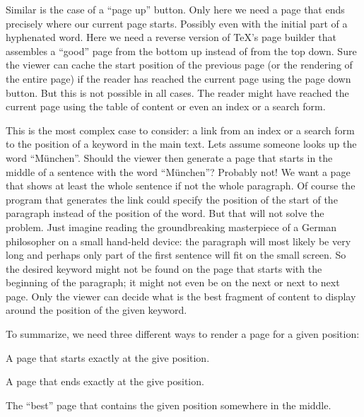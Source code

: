 Similar is the case of a ``page up'' button. Only here we need a page
that ends precisely where our current page starts. Possibly even with
the initial part of a hyphenated word. Here we need a reverse version
of \TeX's page builder that assembles a ``good'' page from the bottom
up instead of from the top down.  Sure the viewer can cache the start
position of the previous page (or the rendering of the entire page) if
the reader has reached the current page using the page down
button. But this is not possible in all cases. The reader might have
reached the current page using the table of content or even an index
or a search form.

This is the most complex case to consider: a link from an index or a
search form to the position of a keyword in the main text. Lets assume
someone looks up the word ``M\"unchen''.  Should the viewer then
generate a page that starts in the middle of a sentence with the word
``M\"unchen''? Probably not! We want a page that shows at least the whole sentence if
not the whole paragraph.  Of course the program that generates the
link could specify the position of the start of the paragraph instead
of the position of the word. But that will not solve the problem. Just
imagine reading the groundbreaking masterpiece of a German philosopher
on a small hand-held device: the paragraph will most likely be very
long and perhaps only part of the first sentence will fit on the small
screen. So the desired keyword might not be found on the page that
starts with the beginning of the paragraph; it might not even be on
the next or next to next page. Only the viewer can decide what is the
best fragment of content to display around the position of the given
keyword.

To summarize, we need three different ways to render a page for a given position:
\itemize
\item A page that starts exactly at the give position.
\item A page that ends exactly at the give position.
\item The ``best'' page that contains the given position somewhere in the middle.
\enditemize

